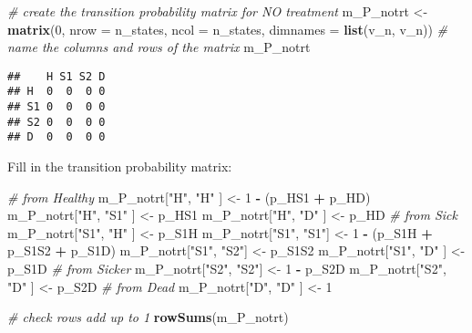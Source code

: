 \documentclass[
]{article}
\newenvironment{Shaded}{\begin{snugshade}}{\end{snugshade}}
\newcommand{\CommentTok}[1]{\textcolor[rgb]{0.56,0.35,0.01}{\textit{#1}}}
\newcommand{\DataTypeTok}[1]{\textcolor[rgb]{0.13,0.29,0.53}{#1}}
\newcommand{\DecValTok}[1]{\textcolor[rgb]{0.00,0.00,0.81}{#1}}
\newcommand{\KeywordTok}[1]{\textcolor[rgb]{0.13,0.29,0.53}{\textbf{#1}}}
\newcommand{\NormalTok}[1]{#1}
\newcommand{\OperatorTok}[1]{\textcolor[rgb]{0.81,0.36,0.00}{\textbf{#1}}}
\newcommand{\StringTok}[1]{\textcolor[rgb]{0.31,0.60,0.02}{#1}}
\begin{document}
\begin{Shaded}
\begin{Highlighting}[]
\CommentTok{# create the transition probability matrix for NO treatment}
\NormalTok{m_P_notrt  <-}\StringTok{ }\KeywordTok{matrix}\NormalTok{(}\DecValTok{0}\NormalTok{,}
                     \DataTypeTok{nrow =}\NormalTok{ n_states,}
                     \DataTypeTok{ncol =}\NormalTok{ n_states,}
                     \DataTypeTok{dimnames =} \KeywordTok{list}\NormalTok{(v_n, v_n)) }\CommentTok{# name the columns and rows of the matrix}
\NormalTok{m_P_notrt}
\end{Highlighting}
\end{Shaded}

\begin{verbatim}
##    H S1 S2 D
## H  0  0  0 0
## S1 0  0  0 0
## S2 0  0  0 0
## D  0  0  0 0
\end{verbatim}

Fill in the transition probability matrix:

\begin{Shaded}
\begin{Highlighting}[]
\CommentTok{# from Healthy}
\NormalTok{m_P_notrt[}\StringTok{"H"}\NormalTok{, }\StringTok{"H"}\NormalTok{  ] <-}\StringTok{ }\DecValTok{1} \OperatorTok{-}\StringTok{ }\NormalTok{(p_HS1 }\OperatorTok{+}\StringTok{ }\NormalTok{p_HD)}
\NormalTok{m_P_notrt[}\StringTok{"H"}\NormalTok{, }\StringTok{"S1"}\NormalTok{ ] <-}\StringTok{ }\NormalTok{p_HS1}
\NormalTok{m_P_notrt[}\StringTok{"H"}\NormalTok{, }\StringTok{"D"}\NormalTok{  ] <-}\StringTok{ }\NormalTok{p_HD}
\CommentTok{# from Sick}
\NormalTok{m_P_notrt[}\StringTok{"S1"}\NormalTok{, }\StringTok{"H"}\NormalTok{ ] <-}\StringTok{ }\NormalTok{p_S1H}
\NormalTok{m_P_notrt[}\StringTok{"S1"}\NormalTok{, }\StringTok{"S1"}\NormalTok{] <-}\StringTok{ }\DecValTok{1} \OperatorTok{-}\StringTok{ }\NormalTok{(p_S1H }\OperatorTok{+}\StringTok{ }\NormalTok{p_S1S2 }\OperatorTok{+}\StringTok{ }\NormalTok{p_S1D)}
\NormalTok{m_P_notrt[}\StringTok{"S1"}\NormalTok{, }\StringTok{"S2"}\NormalTok{] <-}\StringTok{ }\NormalTok{p_S1S2}
\NormalTok{m_P_notrt[}\StringTok{"S1"}\NormalTok{, }\StringTok{"D"}\NormalTok{ ] <-}\StringTok{ }\NormalTok{p_S1D}
\CommentTok{# from Sicker}
\NormalTok{m_P_notrt[}\StringTok{"S2"}\NormalTok{, }\StringTok{"S2"}\NormalTok{] <-}\StringTok{ }\DecValTok{1} \OperatorTok{-}\StringTok{ }\NormalTok{p_S2D}
\NormalTok{m_P_notrt[}\StringTok{"S2"}\NormalTok{, }\StringTok{"D"}\NormalTok{ ] <-}\StringTok{ }\NormalTok{p_S2D}
\CommentTok{# from Dead}
\NormalTok{m_P_notrt[}\StringTok{"D"}\NormalTok{, }\StringTok{"D"}\NormalTok{  ] <-}\StringTok{ }\DecValTok{1}

\CommentTok{# check rows add up to 1}
\KeywordTok{rowSums}\NormalTok{(m_P_notrt)}
\end{Highlighting}
\end{Shaded}
\end{document}
